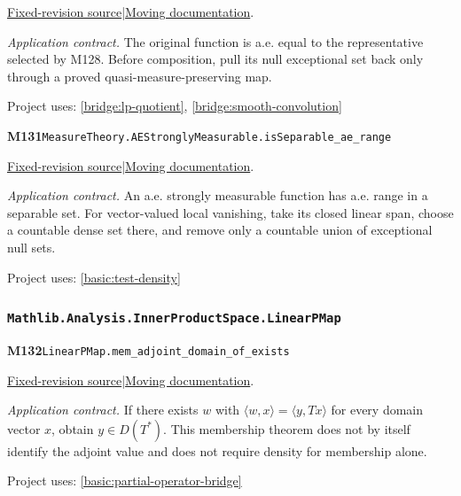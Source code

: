 \documentclass[11pt,a4paper]{article}
\theoremstyle{definition}
\theoremstyle{remark}
\begin{document}
\href{https://github.com/leanprover-community/mathlib4/blob/9bac2d0692944a775113f7c130fd5e5b4608a854/Mathlib/MeasureTheory/Function/StronglyMeasurable/AEStronglyMeasurable.lean}{Fixed-revision source}\quad|\quad\href{https://leanprover-community.github.io/mathlib4_docs/Mathlib/MeasureTheory/Function/StronglyMeasurable/AEStronglyMeasurable.html#MeasureTheory.AEStronglyMeasurable.ae_eq_mk}{Moving documentation}.\par
\noindent\textit{Application contract.} The original function is a.e. equal to the representative selected by M128. Before composition, pull its null exceptional set back only through a proved quasi-measure-preserving map.\par
{\small Project uses: \ref{bridge:lp-quotient}, \ref{bridge:smooth-convolution}}\par\medskip

\noindent\textbf{M131}\label{base:M131}\quad\nolinkurl{MeasureTheory.AEStronglyMeasurable.isSeparable_ae_range}

\href{https://github.com/leanprover-community/mathlib4/blob/9bac2d0692944a775113f7c130fd5e5b4608a854/Mathlib/MeasureTheory/Function/StronglyMeasurable/AEStronglyMeasurable.lean}{Fixed-revision source}\quad|\quad\href{https://leanprover-community.github.io/mathlib4_docs/Mathlib/MeasureTheory/Function/StronglyMeasurable/AEStronglyMeasurable.html#MeasureTheory.AEStronglyMeasurable.isSeparable_ae_range}{Moving documentation}.\par
\noindent\textit{Application contract.} An a.e. strongly measurable function has a.e. range in a separable set. For vector-valued local vanishing, take its closed linear span, choose a countable dense set there, and remove only a countable union of exceptional null sets.\par
{\small Project uses: \ref{basic:test-density}}\par\medskip

\subsubsection*{\nolinkurl{Mathlib.Analysis.InnerProductSpace.LinearPMap}}
\noindent\textbf{M132}\label{base:M132}\quad\nolinkurl{LinearPMap.mem_adjoint_domain_of_exists}

\href{https://github.com/leanprover-community/mathlib4/blob/9bac2d0692944a775113f7c130fd5e5b4608a854/Mathlib/Analysis/InnerProductSpace/LinearPMap.lean}{Fixed-revision source}\quad|\quad\href{https://leanprover-community.github.io/mathlib4_docs/Mathlib/Analysis/InnerProductSpace/LinearPMap.html#LinearPMap.mem_adjoint_domain_of_exists}{Moving documentation}.\par
\noindent\textit{Application contract.} If there exists $w$ with $\langle w,x\rangle=\langle y,Tx\rangle$ for every domain vector $x$, obtain $y\in D(T^*)$. This membership theorem does not by itself identify the adjoint value and does not require density for membership alone.\par
{\small Project uses: \ref{basic:partial-operator-bridge}}\par\medskip
\end{document}
